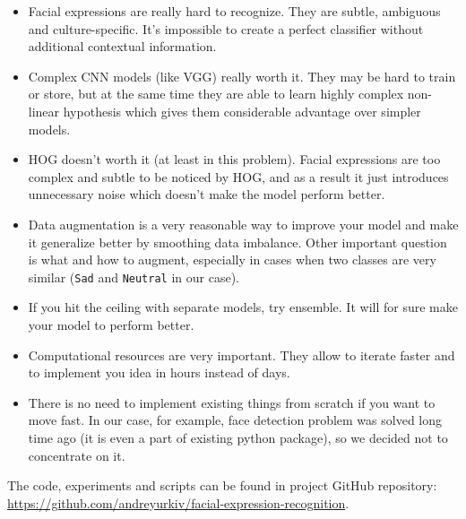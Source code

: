 \begin{itemize}
	\item 
	Facial expressions are really hard to recognize. They are subtle, ambiguous and culture-specific. It's impossible to create a perfect classifier without additional contextual information.
	\item 
	Complex CNN models (like VGG) really worth it. They may be hard to train or store, but at the same time they are able to learn highly complex non-linear hypothesis which gives them considerable advantage over simpler models. 
	\item 
	HOG doesn't worth it (at least in this problem). Facial expressions are too complex and subtle to be noticed by HOG, and as a result it just introduces unnecessary noise which doesn't make the model perform better.
	\item 
	Data augmentation is a very reasonable way to improve your model and make it generalize better by smoothing data imbalance. Other important question is what and how to augment, especially in cases when two classes are very similar (\texttt{Sad} and \texttt{Neutral} in our case).
	\item 
	If you hit the ceiling with separate models, try ensemble. It will for sure make your model to perform better.
	\item 
	Computational resources are very important. They allow to iterate faster and to implement you idea in hours instead of days. 
	\item
	There is no need to implement existing things from scratch if you want to move fast. In our case, for example, face detection problem was solved long time ago (it is even a part of existing python package), so we decided not to concentrate on it.
\end{itemize}



The code, experiments and scripts can be found in project GitHub repository:\\ 

\url{https://github.com/andreyurkiv/facial-expression-recognition}.




